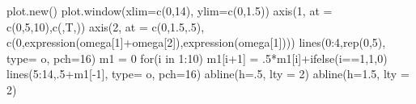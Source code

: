 \documentclass[
  letterpaper,
  DIV=11,
  numbers=noendperiod]{scrartcl}
\newenvironment{Shaded}{\begin{snugshade}}{\end{snugshade}}
\newcommand{\AttributeTok}[1]{\textcolor[rgb]{0.40,0.45,0.13}{#1}}
\newcommand{\ControlFlowTok}[1]{\textcolor[rgb]{0.00,0.23,0.31}{#1}}
\newcommand{\DecValTok}[1]{\textcolor[rgb]{0.68,0.00,0.00}{#1}}
\newcommand{\FloatTok}[1]{\textcolor[rgb]{0.68,0.00,0.00}{#1}}
\newcommand{\FunctionTok}[1]{\textcolor[rgb]{0.28,0.35,0.67}{#1}}
\newcommand{\NormalTok}[1]{\textcolor[rgb]{0.00,0.23,0.31}{#1}}
\newcommand{\OtherTok}[1]{\textcolor[rgb]{0.00,0.23,0.31}{#1}}
\newcommand{\SpecialCharTok}[1]{\textcolor[rgb]{0.37,0.37,0.37}{#1}}
\newcommand{\StringTok}[1]{\textcolor[rgb]{0.13,0.47,0.30}{#1}}
\theoremstyle{plain}
\theoremstyle{plain}
\theoremstyle{definition}
\theoremstyle{definition}
\theoremstyle{remark}
\begin{document}
\begin{Shaded}
\begin{Highlighting}[]
\FunctionTok{plot.new}\NormalTok{()}
\FunctionTok{plot.window}\NormalTok{(}\AttributeTok{xlim=}\FunctionTok{c}\NormalTok{(}\DecValTok{0}\NormalTok{,}\DecValTok{14}\NormalTok{), }\AttributeTok{ylim=}\FunctionTok{c}\NormalTok{(}\DecValTok{0}\NormalTok{,}\FloatTok{1.5}\NormalTok{))}
\FunctionTok{axis}\NormalTok{(}\DecValTok{1}\NormalTok{, }\AttributeTok{at =} \FunctionTok{c}\NormalTok{(}\DecValTok{0}\NormalTok{,}\DecValTok{5}\NormalTok{,}\DecValTok{10}\NormalTok{),}\FunctionTok{c}\NormalTok{(}\StringTok{\textquotesingle{}\textquotesingle{}}\NormalTok{,}\StringTok{\textquotesingle{}T\textquotesingle{}}\NormalTok{,}\StringTok{\textquotesingle{}\textquotesingle{}}\NormalTok{))}
\FunctionTok{axis}\NormalTok{(}\DecValTok{2}\NormalTok{, }\AttributeTok{at =} \FunctionTok{c}\NormalTok{(}\DecValTok{0}\NormalTok{,}\FloatTok{1.5}\NormalTok{,.}\DecValTok{5}\NormalTok{), }\FunctionTok{c}\NormalTok{(}\DecValTok{0}\NormalTok{,}\FunctionTok{expression}\NormalTok{(omega[}\DecValTok{1}\NormalTok{]}\SpecialCharTok{+}\NormalTok{omega[}\DecValTok{2}\NormalTok{]),}\FunctionTok{expression}\NormalTok{(omega[}\DecValTok{1}\NormalTok{])))}
\FunctionTok{lines}\NormalTok{(}\DecValTok{0}\SpecialCharTok{:}\DecValTok{4}\NormalTok{,}\FunctionTok{rep}\NormalTok{(}\DecValTok{0}\NormalTok{,}\DecValTok{5}\NormalTok{), }\AttributeTok{type=} \StringTok{\textquotesingle{}o\textquotesingle{}}\NormalTok{, }\AttributeTok{pch=}\DecValTok{16}\NormalTok{)}
\NormalTok{m1 }\OtherTok{=} \DecValTok{0}
\ControlFlowTok{for}\NormalTok{(i }\ControlFlowTok{in} \DecValTok{1}\SpecialCharTok{:}\DecValTok{10}\NormalTok{) m1[i}\SpecialCharTok{+}\DecValTok{1}\NormalTok{] }\OtherTok{=}\NormalTok{ .}\DecValTok{5}\SpecialCharTok{*}\NormalTok{m1[i]}\SpecialCharTok{+}\FunctionTok{ifelse}\NormalTok{(i}\SpecialCharTok{==}\DecValTok{1}\NormalTok{,}\DecValTok{1}\NormalTok{,}\DecValTok{0}\NormalTok{)}
\FunctionTok{lines}\NormalTok{(}\DecValTok{5}\SpecialCharTok{:}\DecValTok{14}\NormalTok{,.}\DecValTok{5}\SpecialCharTok{+}\NormalTok{m1[}\SpecialCharTok{{-}}\DecValTok{1}\NormalTok{], }\AttributeTok{type=} \StringTok{\textquotesingle{}o\textquotesingle{}}\NormalTok{, }\AttributeTok{pch=}\DecValTok{16}\NormalTok{)}
\FunctionTok{abline}\NormalTok{(}\AttributeTok{h=}\NormalTok{.}\DecValTok{5}\NormalTok{, }\AttributeTok{lty =} \DecValTok{2}\NormalTok{)}
\FunctionTok{abline}\NormalTok{(}\AttributeTok{h=}\FloatTok{1.5}\NormalTok{, }\AttributeTok{lty =} \DecValTok{2}\NormalTok{)}
\end{Highlighting}
\end{Shaded}
\end{document}
